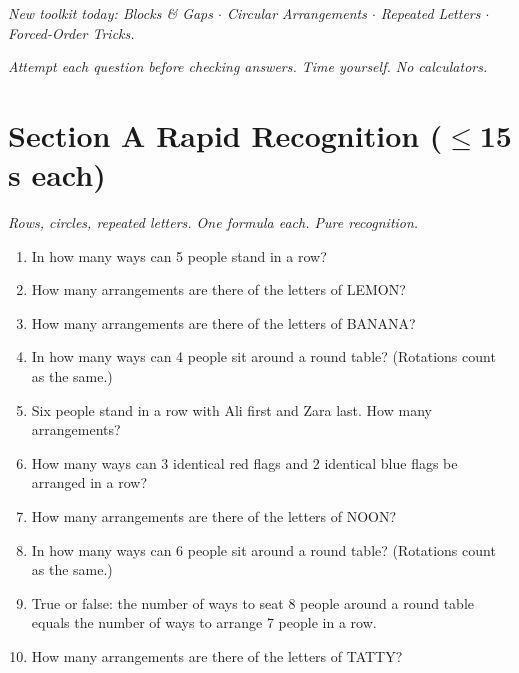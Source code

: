 \documentclass[11pt,a4paper]{article}
\begin{document}
\noindent\textit{New toolkit today: Blocks \& Gaps $\cdot$ Circular Arrangements $\cdot$ Repeated Letters $\cdot$ Forced-Order Tricks.}

\vspace{2pt}
\noindent\textit{Attempt each question before checking answers. Time yourself. No calculators.}

\section*{Section A \quad Rapid Recognition \hfill{\normalfont\small($\leq$15 s each)}}

\noindent\textit{Rows, circles, repeated letters. One formula each. Pure recognition.}

\begin{enumerate}

\item In how many ways can 5 people stand in a row?

\item How many arrangements are there of the letters of LEMON?

\item How many arrangements are there of the letters of BANANA?

\item In how many ways can 4 people sit around a round table? (Rotations count as the same.)

\item Six people stand in a row with Ali first and Zara last. How many arrangements?

\item How many ways can 3 identical red flags and 2 identical blue flags be arranged in a row?

\item How many arrangements are there of the letters of NOON?

\item In how many ways can 6 people sit around a round table? (Rotations count as the same.)

\item True or false: the number of ways to seat 8 people around a round table equals the number of ways to arrange 7 people in a row.

\item How many arrangements are there of the letters of TATTY?

\end{enumerate}
\end{document}
